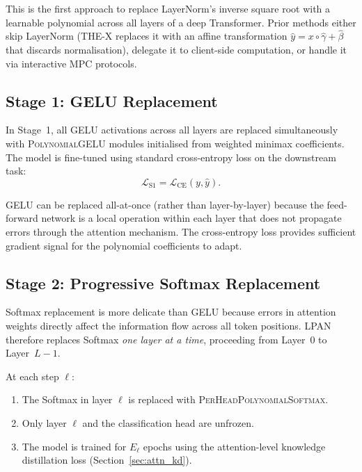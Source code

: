 This is the first approach to replace LayerNorm's inverse square root with a learnable polynomial across all layers of a deep Transformer. Prior methods either skip LayerNorm (THE-X replaces it with an affine transformation $\hat{y} = x \circ \hat{\gamma} + \hat{\beta}$ that discards normalisation), delegate it to client-side computation, or handle it via interactive MPC protocols.


\subsection{Stage 1: GELU Replacement}
\label{sec:stage1}

In Stage~1, all GELU activations across all layers are replaced simultaneously with \textsc{PolynomialGELU} modules initialised from weighted minimax coefficients. The model is fine-tuned using standard cross-entropy loss on the downstream task:
\begin{equation}
    \mathcal{L}_{\mathrm{S1}} = \mathcal{L}_{\mathrm{CE}}(y, \hat{y}).
    \label{eq:stage1_loss}
\end{equation}

GELU can be replaced all-at-once (rather than layer-by-layer) because the feed-forward network is a local operation within each layer that does not propagate errors through the attention mechanism. The cross-entropy loss provides sufficient gradient signal for the polynomial coefficients to adapt.

\subsection{Stage 2: Progressive Softmax Replacement}
\label{sec:stage2}

Softmax replacement is more delicate than GELU because errors in attention weights directly affect the information flow across all token positions. LPAN therefore replaces Softmax \emph{one layer at a time}, proceeding from Layer~0 to Layer~$L-1$.

At each step $\ell$:
\begin{enumerate}
    \item The Softmax in layer $\ell$ is replaced with \textsc{PerHeadPolynomialSoftmax}.
    \item Only layer $\ell$ and the classification head are unfrozen.
    \item The model is trained for $E_\ell$ epochs using the attention-level knowledge distillation loss (Section~\ref{sec:attn_kd}).
\end{enumerate}

